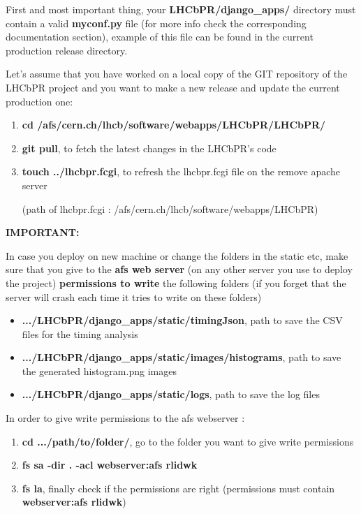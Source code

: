 \documentclass{lhcbnote}
\begin{document}
First and most important thing, your {\bf LHCbPR/django\_apps/} directory must contain a valid {\bf myconf.py} file 
(for more info check the corresponding documentation section), example of this file can be found in the current production release directory.

Let's assume that you have worked on a local copy of the GIT repository of the LHCbPR project and you want to 
make a new release and update the current production one:

\begin{enumerate}
\item
{\bf cd /afs/cern.ch/lhcb/software/webapps/LHCbPR/LHCbPR/}
\item
{\bf git pull}, to fetch the latest changes in the LHCbPR's code
\item

{\bf touch ../lhcbpr.fcgi}, to refresh the lhcbpr.fcgi file on the remove apache server 

(path of lhcbpr.fcgi : /afs/cern.ch/lhcb/software/webapps/LHCbPR)
\end{enumerate}

\vspace{2mm}

{\bf IMPORTANT:}

In case you deploy on new machine or change the folders in the static etc, make sure that you give to the {\bf afs web server} (on any other server you use to deploy the project) 
{\bf permissions to write} the following folders (if you forget that the server will crash each time it tries to write on these folders)

\begin{itemize}
\item
{\bf .../LHCbPR/django\_apps/static/timingJson}, path to save the CSV files for the timing analysis
\item
{\bf .../LHCbPR/django\_apps/static/images/histograms}, path to save the generated histogram.png images
\item
{\bf .../LHCbPR/django\_apps/static/logs}, path to save the log files
\end{itemize}

In order to give write permissions to the afs webserver :

\begin{enumerate}
\item
{\bf cd .../path/to/folder/}, go to the folder you want to give write permissions
\item
{\bf fs sa -dir . -acl  webserver:afs rlidwk}
\item
{\bf fs la}, finally check if the permissions are right (permissions must contain {\bf webserver:afs rlidwk})
\end{enumerate}
\end{document}
